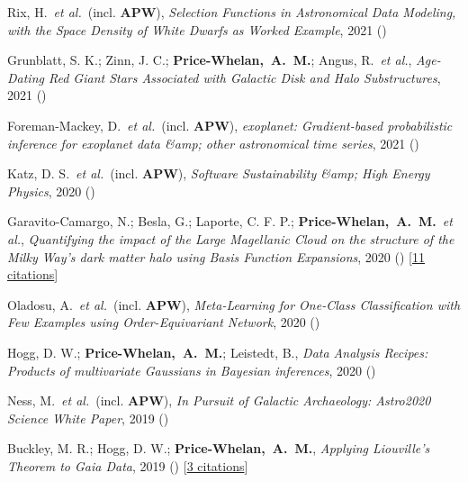 \item[{\color{deemph}\scriptsize13}]Rix, H.~\textit{et al.}~(incl. \textbf{APW}), \textit{Selection Functions in Astronomical Data Modeling, with the Space Density of White Dwarfs as Worked Example}, 2021 ()

\item[{\color{deemph}\scriptsize12}]Grunblatt, S. K.; Zinn, J. C.; \textbf{Price-Whelan,~A.~M.}; Angus, R.~\textit{et al.}, \textit{Age-Dating Red Giant Stars Associated with Galactic Disk and Halo Substructures}, 2021 ()

\item[{\color{deemph}\scriptsize11}]Foreman-Mackey, D.~\textit{et al.}~(incl. \textbf{APW}), \textit{exoplanet: Gradient-based probabilistic inference for exoplanet data {\&}amp; other astronomical time series}, 2021 ()

\item[{\color{deemph}\scriptsize10}]Katz, D. S.~\textit{et al.}~(incl. \textbf{APW}), \textit{Software Sustainability {\&}amp; High Energy Physics}, 2020 ()

\item[{\color{deemph}\scriptsize9}]Garavito-Camargo, N.; Besla, G.; Laporte, C. F. P.; \textbf{Price-Whelan,~A.~M.}~\textit{et al.}, \textit{Quantifying the impact of the Large Magellanic Cloud on the structure of the Milky Way's dark matter halo using Basis Function Expansions}, 2020 () [\href{http://adsabs.harvard.edu/abs/2020arXiv201000816G}{11 citations}]

\item[{\color{deemph}\scriptsize8}]Oladosu, A.~\textit{et al.}~(incl. \textbf{APW}), \textit{Meta-Learning for One-Class Classification with Few Examples using Order-Equivariant Network}, 2020 ()

\item[{\color{deemph}\scriptsize7}]Hogg, D. W.; \textbf{Price-Whelan,~A.~M.}; Leistedt, B., \textit{Data Analysis Recipes: Products of multivariate Gaussians in Bayesian inferences}, 2020 ()

\item[{\color{deemph}\scriptsize6}]Ness, M.~\textit{et al.}~(incl. \textbf{APW}), \textit{In Pursuit of Galactic Archaeology: Astro2020 Science White Paper}, 2019 ()

\item[{\color{deemph}\scriptsize5}]Buckley, M. R.; Hogg, D. W.; \textbf{Price-Whelan,~A.~M.}, \textit{Applying Liouville's Theorem to Gaia Data}, 2019 () [\href{http://adsabs.harvard.edu/abs/2019arXiv190700987B}{3 citations}]

